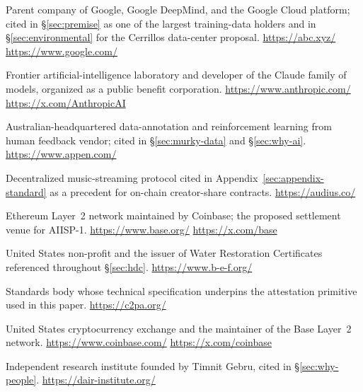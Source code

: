 \documentclass[10pt,a4paper,twocolumn]{article}
\begin{document}
\begin{description}\setlength{\itemsep}{2pt plus 0.5pt}

\item[Alphabet / Google.] Parent company of Google, Google DeepMind, and the Google Cloud platform; cited in \S\ref{sec:premise} as one of the largest training-data holders and in \S\ref{sec:environmental} for the Cerrillos data-center proposal. \url{https://abc.xyz/} \quad \url{https://www.google.com/}

\item[Anthropic.] Frontier artificial-intelligence laboratory and developer of the Claude family of models, organized as a public benefit corporation. \url{https://www.anthropic.com/} \quad \url{https://x.com/AnthropicAI}

\item[Appen.] Australian-headquartered data-annotation and reinforcement learning from human feedback vendor; cited in \S\ref{sec:murky-data} and \S\ref{sec:why-ai}. \url{https://www.appen.com/}

\item[Audius.] Decentralized music-streaming protocol cited in Appendix~\ref{sec:appendix-standard} as a precedent for on-chain creator-share contracts. \url{https://audius.co/}

\item[Base.] Ethereum Layer~2 network maintained by Coinbase; the proposed settlement venue for AIISP-1. \url{https://www.base.org/} \quad \url{https://x.com/base}

\item[Bonneville Environmental Foundation.] United States non-profit and the issuer of Water Restoration Certificates referenced throughout \S\ref{sec:hdc}. \url{https://www.b-e-f.org/}

\item[Coalition for Content Provenance and Authenticity.] Standards body whose technical specification underpins the attestation primitive used in this paper. \url{https://c2pa.org/}

\item[Coinbase.] United States cryptocurrency exchange and the maintainer of the Base Layer~2 network. \url{https://www.coinbase.com/} \quad \url{https://x.com/coinbase}

\item[Distributed AI Research Institute (DAIR).] Independent research institute founded by Timnit Gebru, cited in \S\ref{sec:why-people}. \url{https://dair-institute.org/}


\end{description}
\end{document}
